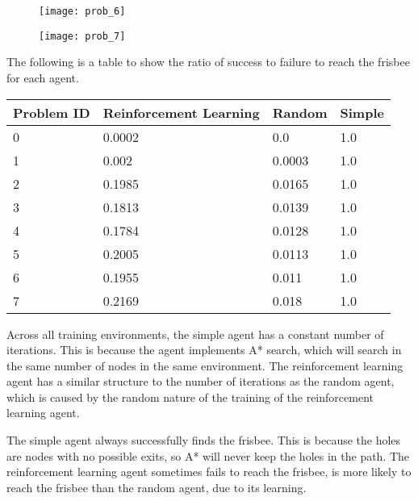 \documentclass[11pt]{article}
\begin{document}
    \begin{figure}[H]
        \texttt{[image: prob\_6]}
    \end{figure}

    \begin{figure}[H]
        \texttt{[image: prob\_7]}
    \end{figure}

    The following is a table to show the ratio of success to failure to reach the frisbee for each agent.
    \begin{tabulary}{0.9\linewidth}{|L|L|L|L|}
        \hline
        Problem ID & Reinforcement Learning & Random & Simple \\
         & 0.0002 & 0.0 & 1.0 \\
        1 & 0.002 & 0.0003 & 1.0 \\
        2 & 0.1985 & 0.0165 & 1.0 \\
        3 & 0.1813 & 0.0139 & 1.0 \\
        4 & 0.1784 & 0.0128 & 1.0 \\
        5 & 0.2005 & 0.0113 & 1.0 \\
        6 & 0.1955 & 0.011 & 1.0 \\
        7 & 0.2169 & 0.018 & 1.0 \\
        \hline
    \end{tabulary}

    Across all training environments, the simple agent has a constant number of iterations.
    This is because the agent implements A* search, which will search in the same number of nodes in the same
    environment.
    The reinforcement learning agent has a similar structure to the number of iterations as the random agent, which is
    caused by the random nature of the training of the reinforcement learning agent.

    The simple agent always successfully finds the frisbee.
    This is because the holes are nodes with no possible exits, so A* will never keep the holes in the path.
    The reinforcement learning agent sometimes fails to reach the frisbee, is more likely to reach the frisbee than the
    random agent, due to its learning.
\end{document}
